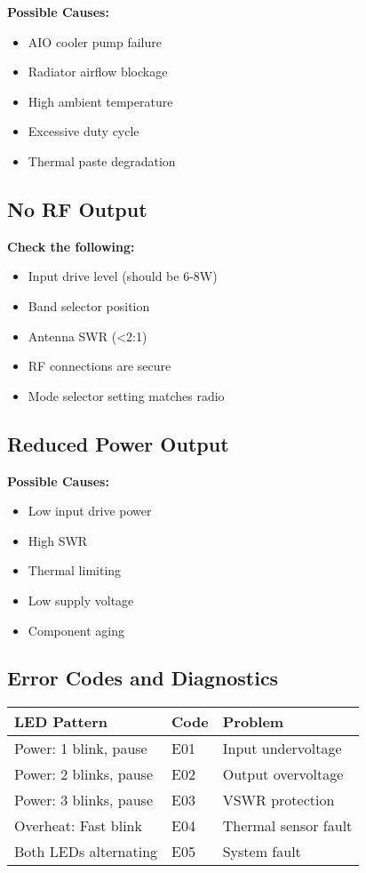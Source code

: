 \documentclass[11pt,a4paper]{article}
\begin{document}
\textbf{Possible Causes:}
\begin{itemize}
    \item AIO cooler pump failure
    \item Radiator airflow blockage
    \item High ambient temperature
    \item Excessive duty cycle
    \item Thermal paste degradation
\end{itemize}

\subsection{No RF Output}
\textbf{Check the following:}
\begin{itemize}
    \item Input drive level (should be 6-8W)
    \item Band selector position
    \item Antenna SWR (<2:1)
    \item RF connections are secure
    \item Mode selector setting matches radio
\end{itemize}

\subsection{Reduced Power Output}
\textbf{Possible Causes:}
\begin{itemize}
    \item Low input drive power
    \item High SWR
    \item Thermal limiting
    \item Low supply voltage
    \item Component aging
\end{itemize}

\subsection{Error Codes and Diagnostics}

\begin{center}
\begin{tabular}{|l|l|l|}
\hline
\textbf{LED Pattern} & \textbf{Code} & \textbf{Problem} \\
\hline
Power: 1 blink, pause & E01 & Input undervoltage \\
Power: 2 blinks, pause & E02 & Output overvoltage \\
Power: 3 blinks, pause & E03 & VSWR protection \\
Overheat: Fast blink & E04 & Thermal sensor fault \\
Both LEDs alternating & E05 & System fault \\
\hline
\end{tabular}
\end{center}
\end{document}
